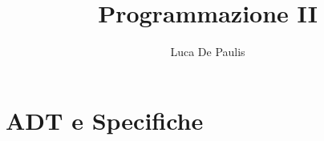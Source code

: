 \documentclass[italian,oneside,headinclude,10pt]{scrbook}
\begin{document}
\author{Luca De Paulis}
\title{Programmazione II}
\maketitle

\tableofcontents





\chapter{ADT e Specifiche}

\end{document}
